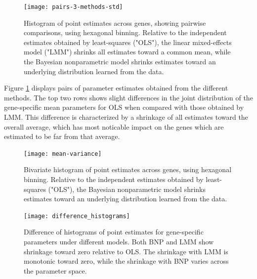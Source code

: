 \begin{figure}[ht]
\centering
\texttt{[image: pairs-3-methods-std]}
\caption{Histogram of point estimates across genes, showing pairwise comparisons, using hexagonal binning. Relative to the independent estimates obtained by least-squares ("OLS"), the linear mixed-effects model ("LMM") shrinks all estimates toward a common mean, while the Bayesian nonparametric model shrinks estimates toward an underlying distribution learned from the data.}
\label{pairs-3-methods}
\end{figure}

Figure \ref{pairs-3-methods} displays pairs of parameter estimates obtained from the different methods. The top two rows shows slight differences in the joint distribution of the gene-specific mean parameters for OLS when compared with those obtained by LMM. This difference is characterized by a shrinkage of all estimates toward the overall average, which has most noticable impact on the genes which are estimated to be far from that average.

\begin{figure}[ht]
\centering
\texttt{[image: mean-variance]}
\caption{Bivariate histogram of point estimates across genes, using hexagonal binning. Relative to the independent estimates obtained by least-squares ("OLS"), the Bayesian nonparametric model shrinks estimates toward an underlying distribution learned from the data.}
\label{mean-variance}
\end{figure}

\begin{figure}[ht]
\centering
\texttt{[image: difference\_histograms]}
\caption{Difference of histograms of point estimates for gene-specific parameters under different models. Both BNP and LMM show shrinkage toward zero relative to OLS. The shrinkage with LMM is monotonic toward zero, while the shrinkage with BNP varies across the parameter space.}
\label{diff-hist}
\end{figure}


